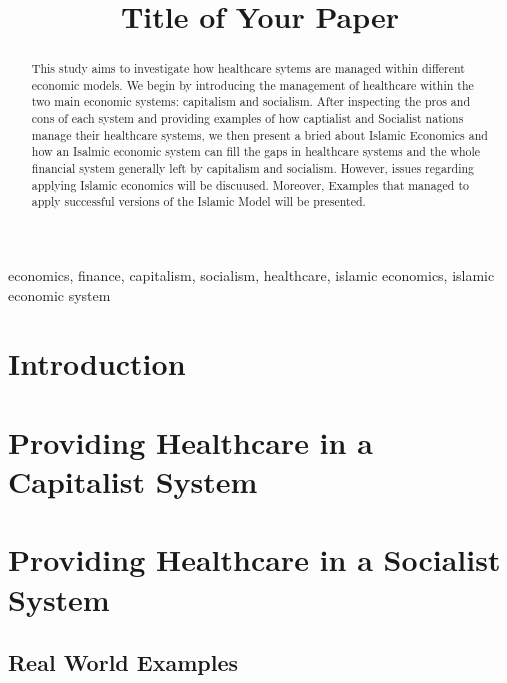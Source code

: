 \documentclass[conference]{IEEEtran}
\begin{document}
\title{Title of Your Paper}

\author{
}

\maketitle

\begin{abstract}
This study aims to investigate how healthcare sytems are managed within
different economic models. We begin by introducing the management of healthcare
within the two main economic systems: capitalism and socialism. After inspecting the
pros and cons of each system and providing examples of how captialist and Socialist
nations manage their healthcare systems, we then present a bried about Islamic Economics
and how an Isalmic economic system can fill the gaps in healthcare systems and the whole
financial system generally left by capitalism and socialism. However, issues regarding applying
Islamic economics will be discuused. Moreover, Examples that managed to apply successful versions
of the Islamic Model will be presented. 
\end{abstract}

\begin{IEEEkeywords}
economics, finance, capitalism, socialism, healthcare, islamic economics,
islamic economic system
\end{IEEEkeywords}

\section{Introduction}


\section{Providing Healthcare in a Capitalist System}


\section{Providing Healthcare in a Socialist System}


\subsection{Real World Examples}

\end{document}
